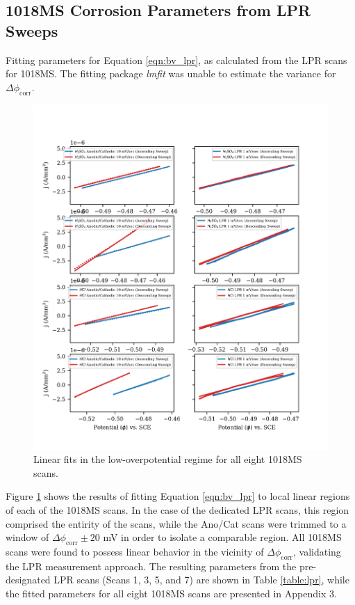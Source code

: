\subsection{1018MS Corrosion Parameters from LPR Sweeps}

	\begin{table}[h!]
		\centering
		
		\caption{Fitting parameters for Equation \ref{eqn:bv_lpr}, as calculated from the LPR scans for 1018MS.  The fitting package \textit{lmfit} was unable to estimate the variance for $\Delta \phi_{\text{corr}}$.}
		\label{table:lpr}
	\end{table}

	\begin{figure}[h!]
		\centering
		\includegraphics[width=5.0in]{resources/fig_2c.png}
		\caption{Linear fits in the low-overpotential regime for all eight 1018MS scans.}
		\label{fig:lpr}
	\end{figure}

Figure \ref{fig:lpr} shows the results of fitting Equation \ref{eqn:bv_lpr} to local linear regions of each of the 1018MS scans.  In the case of the dedicated LPR scans, this region comprised the entirity of the scans, while the Ano/Cat scans were trimmed to a window of $\Delta \phi_{\text{corr}} \pm 20$ mV in order to isolate a comparable region.  All 1018MS scans were found to possess linear behavior in the vicinity of $\Delta \phi_{\text{corr}}$, validating the LPR measurement approach.  The resulting parameters from the pre-designated LPR scans (Scans 1, 3, 5, and 7) are shown in Table \ref{table:lpr}, while the fitted parameters for all eight 1018MS scans are presented in Appendix 3.

